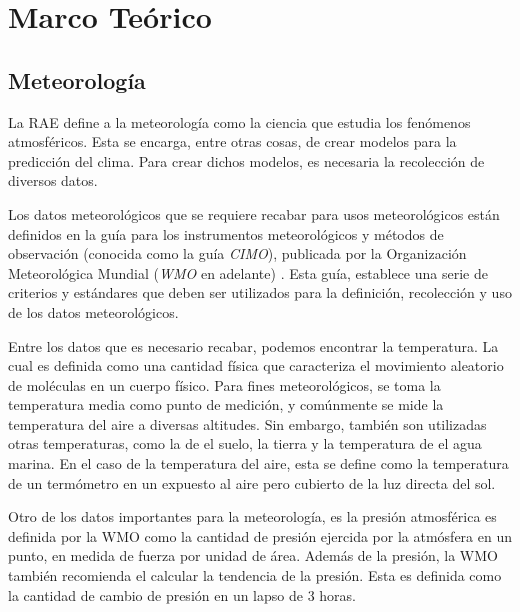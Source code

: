\section{Marco Teórico}



\subsection{Meteorología}

La RAE define a la meteorología como la ciencia que estudia los fenómenos atmosféricos. Esta se encarga, entre otras cosas, de crear modelos para la predicción del clima. Para crear dichos modelos, es necesaria la recolección de diversos datos.

Los datos meteorológicos que se requiere recabar para usos meteorológicos están definidos en la guía para los instrumentos meteorológicos y métodos de observación (conocida como la guía \textit{CIMO}), publicada por la Organización Meteorológica Mundial (\textit{WMO} en adelante) \cite{CIMO_2008}. Esta guía, establece una serie de criterios y estándares que deben ser utilizados para la definición, recolección y uso de los datos meteorológicos.

Entre los datos que es necesario recabar, podemos encontrar la temperatura. La cual es definida como una cantidad física que caracteriza el movimiento aleatorio de moléculas en un cuerpo físico. Para fines meteorológicos, se toma la temperatura media como punto de medición, y comúnmente se mide la temperatura del aire a diversas altitudes. Sin embargo, también son utilizadas otras temperaturas, como la de el suelo, la tierra y la temperatura de el agua marina. En el caso de la temperatura del aire, esta se define como la temperatura de un termómetro en un expuesto al aire pero cubierto de la luz directa del sol.

Otro de los datos importantes para la meteorología, es la presión atmosférica es definida por la WMO \cite{CIMO_2008} como la cantidad de presión ejercida por la atmósfera en un punto, en medida de fuerza por unidad de área. Además de la presión, la WMO también recomienda el calcular la tendencia de la presión. Esta es definida como la cantidad de cambio de presión en un lapso de 3 horas.

